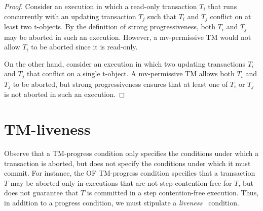 \begin{proof}
Consider an execution in which a read-only transaction $T_i$ that runs concurrently with an
updating transaction $T_j$ such that $T_i$ and $T_j$ conflict on at least two t-objects.
By the definition of strong progressiveness, both $T_i$ and $T_j$ may be aborted in such an execution.
However, a mv-permissive TM would not allow $T_i$ to be aborted since it is read-only.

On the other hand, consider an execution in which two updating transactions $T_i$ and $T_j$ that conflict on a single t-object.
A mv-permissive TM allows both $T_i$ and $T_j$ to be aborted, but strong progressiveness ensures that at least one of
$T_i$ or $T_j$ is not aborted in such an execution.
\end{proof}
\section{TM-liveness}
\label{sec:tm-liveness}
Observe that a TM-progress condition only specifies the conditions under which a transaction is aborted, but does not
specify the conditions under which it must commit.
For instance, the OF TM-progress condition specifies that a transaction $T$ may be aborted only in executions
that are not step contention-free for $T$, but does not guarantee that $T$ is committed in a step contention-free execution.
Thus, in addition to a progress condition, we must stipulate a \emph{liveness}~\cite{AS85,Lyn96} condition.

